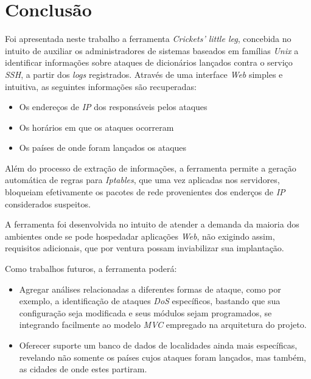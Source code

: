 \chapter*{Conclusão}

Foi apresentada neste trabalho a ferramenta \textit{Crickets' little leg}, concebida no intuito de auxiliar os administradores de sistemas baseados em famílias \textit{Unix} a identificar informações sobre ataques de dicionários lançados contra o serviço \textit{SSH}, a partir dos \textit{logs} registrados. Através de uma interface \textit{Web} simples e intuitiva, as seguintes informações são recuperadas:

\begin{singlespace}
    \begin{itemize}
        \item Os endereços de \textit{IP} dos responsáveis pelos ataques
        \item Os horários em que os ataques ocorreram
        \item Os países de onde foram lançados os ataques
    \end{itemize}
\end{singlespace}

Além do processo de extração de informações, a ferramenta permite a geração automática de regras para \textit{Iptables}, que uma vez aplicadas nos servidores, bloqueiam efetivamente os pacotes de rede provenientes dos enderços de \textit{IP} considerados suspeitos.

A ferramenta foi desenvolvida no intuito de atender a demanda da maioria dos ambientes onde se pode hospedadar aplicações \textit{Web}, não exigindo assim, requisitos adicionais, que por ventura possam inviabilizar sua implantação.

Como trabalhos futuros, a ferramenta poderá:

\begin{itemize}
    \item Agregar análises relacionadas a diferentes formas de ataque, como por exemplo, a identificação de ataques \textit{DoS} específicos, bastando que sua configuração seja modificada e seus módulos sejam programados, se integrando facilmente ao modelo \textit{MVC} empregado na arquitetura do projeto.
    \item Oferecer suporte um banco de dados de localidades ainda mais específicas, revelando não somente os países cujos ataques foram lançados, mas também, as cidades de onde estes partiram.
\end{itemize}
